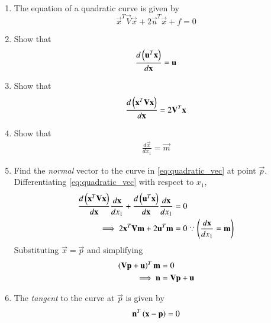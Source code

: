 \renewcommand{\theequation}{\theenumi}
\begin{enumerate}[label=\arabic*.,ref=\thesubsection.\theenumi]
\item The equation of a quadratic curve is given by
%
\begin{equation}
\vec{x}^T\vec{V}\vec{x}+2\vec{u}^T\vec{x}+ f = 0
\label{eq:quadratic_vec}
\end{equation}
%
\item Show that 
\begin{align}
\frac{d\left(\mathbf{u}^T\mathbf{x}\right)}{d\mathbf{x}} = \mathbf{u}
\end{align}
\item Show that 
\begin{align}
\frac{d\left(\mathbf{x}^T\mathbf{V}\mathbf{x}\right)}{d\mathbf{x}} = 2\mathbf{V}^T\mathbf{x}
\end{align}
\item Show that 
\begin{align}
\frac{d\vec{x}}{dx_1} = \vec{m}
\end{align}
%
\item Find the {\em normal} vector to the curve in \eqref{eq:quadratic_vec} at 
point $\vec{p}$.
\\
\solution Differentiating \eqref{eq:quadratic_vec} with respect to 
$x_1$,
\begin{align}
\frac{d\left(\mathbf{x}^T\mathbf{V}\mathbf{x}\right)}{d\mathbf{x}}\frac{d\mathbf{x}}{dx_1}+\frac{d\left(\mathbf{u}^T\mathbf{x}\right)}{d\mathbf{x}}\frac{d\mathbf{x}}{dx_1}
&= 0
\\
\implies 2\mathbf{x}^T\mathbf{V}\mathbf{m}+2\mathbf{u}^T\mathbf{m}
& = 0  \because \left(\frac{d\mathbf{x}}{dx_1} = \mathbf{m}\right)
\end{align}
Substituting  $\vec{x} = \vec{p}$ and simplifying
\begin{align}
\left( \mathbf{V}\mathbf{p}+\mathbf{u}\right)^T\mathbf{m} & = 0 
\\
\implies \mathbf{n} &= \mathbf{V}\mathbf{p}+\mathbf{u}
\end{align}
%
\renewcommand{\theequation}{\theenumi}
\item The {\em tangent} to the curve at $\vec{p}$ is given by 
\begin{align}
\mathbf{n}^T\left(\mathbf{x}-\mathbf{p}\right) = 0
\end{align}

\end{enumerate}
